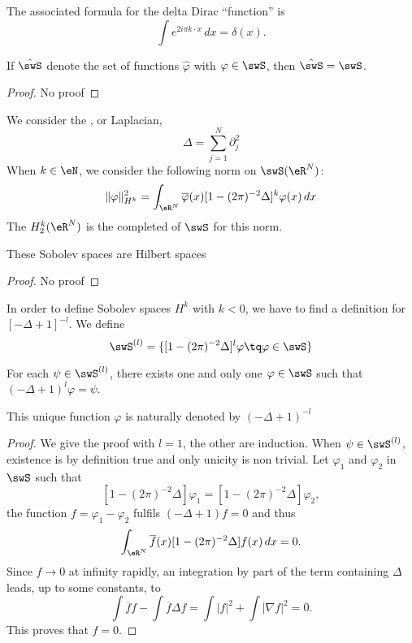 The associated formula for the delta Dirac ``function'' is 
\begin{equation}
  \int e^{2i\pi k\cdot x}\,dx=\delta(x).
\end{equation}

\begin{proposition}
If $\hat\swS$ denote the set of functions $\hat\varphi$ with $\varphi\in\swS$, then $\hat\swS=\swS$. 
\end{proposition}

\begin{proof}
No proof
\end{proof}

We consider the , or Laplacian,
\begin{equation}
\Delta=\sum_{j=1}^{N}\partial_j^2
\end{equation}
When $k\in\eN$, we consider the following norm on $\swS(\eR^N)$:
\begin{equation} \label{eq_def_norm_Sob}
  \| \varphi \|_{H^k}^2=\int_{\eR^N}\overline{\varphi}(x)[1-(2\pi)^{-2}\Delta]^k\varphi(x)\,dx
\end{equation}
The  $H^k_2(\eR^N)$ is the completed of $\swS$ for this norm.

\begin{proposition}
These Sobolev spaces are Hilbert spaces
\end{proposition}

\begin{proof}
No proof
\end{proof}

In order to define Sobolev spaces $H^k$ with $k<0$, we have to find a definition for $[-\Delta+1]^{-l}$. We define
\[ 
  \swS^{(l)}=\{ [1-(2\pi)^{-2}\Delta]^l\varphi\tq \varphi\in\swS \}
\]

\begin{lemma}
For each $\psi\in\swS^{(l)}$, there exists one and only one $\varphi\in\swS$ such that $(-\Delta+1)^l\varphi=\psi$.
\end{lemma}

This unique function $\varphi$ is naturally denoted by $(-\Delta+1)^{-l}$

\begin{proof}
We give the proof with $l=1$, the other are induction. When $\psi\in\swS^{(l)}$, existence is by definition true and only unicity is non trivial. Let $\varphi_1$ and $\varphi_2$ in $\swS$ such that 
\[ 
  [1-(2\pi)^{-2}\Delta]\varphi_1=[1-(2\pi)^{-2}\Delta]\varphi_2,
\]
the function $f=\varphi_1-\varphi_2$ fulfils $(-\Delta+1)f=0$ and thus
\[ 
  \int_{\eR^N}\overline{ f }(x)[1-(2\pi)^{-2}\Delta]f(x)\,dx=0.
\]
Since $f\to 0$ at infinity rapidly, an integration by part of the term containing $\Delta$ leads, up to some constants, to
\[ 
  \int \overline{ f }f-\int \overline{ f }\Delta f=\int | f |^2+\int | \nabla f |^2=0.
\]
This proves that $f=0$.
\end{proof}

